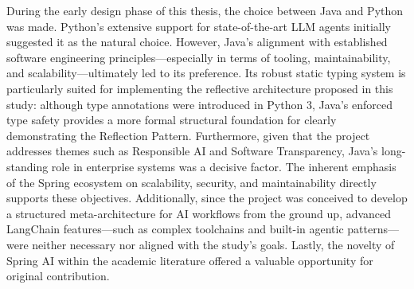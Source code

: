 During the early design phase of this thesis, the choice between Java and Python was made. Python's extensive support for state-of-the-art LLM agents initially suggested it as the natural choice. However, Java's alignment with established software engineering principles—especially in terms of tooling, maintainability, and scalability—ultimately led to its preference. Its robust static typing system is particularly suited for implementing the reflective architecture proposed in this study: although type annotations were introduced in Python 3, Java's enforced type safety provides a more formal structural foundation for clearly demonstrating the Reflection Pattern. Furthermore, given that the project addresses themes such as Responsible AI and Software Transparency, Java's long-standing role in enterprise systems was a decisive factor. The inherent emphasis of the Spring ecosystem on scalability, security, and maintainability directly supports these objectives. Additionally, since the project was conceived to develop a structured meta-architecture for AI workflows from the ground up, advanced LangChain features—such as complex toolchains and built-in agentic patterns—were neither necessary nor aligned with the study's goals. Lastly, the novelty of Spring AI within the academic literature offered a valuable opportunity for original contribution.